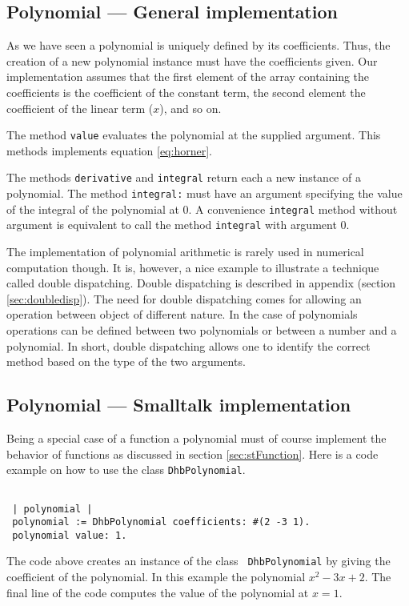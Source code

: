 \documentclass[twoside]{book}
\begin{document}
\subsection{Polynomial --- General implementation}
As we have seen a polynomial is uniquely defined by its
coefficients. Thus, the creation of a new polynomial instance must
have the coefficients given. Our implementation assumes that the
first element of the array containing the coefficients is the
coefficient of the constant term, the second element the
coefficient of the linear term ($x$), and so on.

The method {\tt value} evaluates the polynomial at the supplied
argument. This methods implements equation \ref{eq:horner}.

The methods {\tt derivative} and {\tt integral} return each a new
instance of a polynomial. The method {\tt integral:} must have an
argument specifying the value of the integral of the polynomial at
0. A convenience {\tt integral} method without argument is
equivalent to call the method {\tt integral} with argument 0.

The implementation of polynomial arithmetic is rarely used in
numerical computation though. It is, however, a nice example to
illustrate a technique called double dispatching. Double
dispatching is described in appendix (\cf section
\ref{sec:doubledisp}). The need for double dispatching comes for
allowing an operation between object of different nature. In the
case of polynomials operations can be defined between two
polynomials or between a number and a polynomial. In short, double
dispatching allows one to identify the correct method based on the
type of the two arguments.

\subsection{Polynomial --- Smalltalk implementation}
\label{sec:stPolynomial}  Being a special case of a
function a polynomial must of course implement the behavior of
functions as discussed in section \ref{sec:stFunction}. Here is a
code example on how to use the class {\tt DhbPolynomial}.
\begin{codeExample}
\begin{verbatim}

 | polynomial |
 polynomial := DhbPolynomial coefficients: #(2 -3 1).
 polynomial value: 1.
\end{verbatim}
\end{codeExample}
The code above creates an instance of the class {\tt
DhbPolynomial} by giving the coefficient of the polynomial. In
this example the polynomial $x^2-3x+2$. The final line of the code
computes the value of the polynomial at $x=1$.
\end{document}
